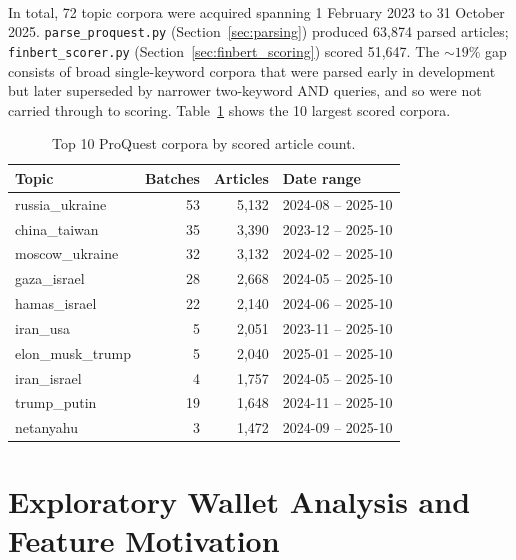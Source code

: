 \documentclass[11pt,a4paper]{article}
\begin{document}
\paragraph{} In total, 72 topic corpora were acquired spanning
1 February 2023 to 31 October 2025. \texttt{parse\_proquest.py}
(Section~\ref{sec:parsing}) produced 63{,}874 parsed articles;
\texttt{finbert\_scorer.py} (Section~\ref{sec:finbert_scoring})
scored 51{,}647. The ${\sim}19\%$ gap consists of broad
single-keyword corpora that were parsed early in development but
later superseded by narrower two-keyword AND queries, and so were
not carried through to scoring. Table~\ref{tab:corpus_sizes} shows
the 10 largest scored corpora.

\begin{table}[H]
\centering
\caption{Top 10 ProQuest corpora by scored article count.}
\label{tab:corpus_sizes}
\small
\begin{tabularx}{\textwidth}{X r r l}
\toprule
\textbf{Topic} & \textbf{Batches} & \textbf{Articles} & \textbf{Date range} \\
\midrule
russia\_ukraine   & 53 & 5{,}132 & 2024-08 -- 2025-10 \\
china\_taiwan     & 35 & 3{,}390 & 2023-12 -- 2025-10 \\
moscow\_ukraine   & 32 & 3{,}132 & 2024-02 -- 2025-10 \\
gaza\_israel      & 28 & 2{,}668 & 2024-05 -- 2025-10 \\
hamas\_israel     & 22 & 2{,}140 & 2024-06 -- 2025-10 \\
iran\_usa         &  5 & 2{,}051 & 2023-11 -- 2025-10 \\
elon\_musk\_trump &  5 & 2{,}040 & 2025-01 -- 2025-10 \\
iran\_israel      &  4 & 1{,}757 & 2024-05 -- 2025-10 \\
trump\_putin      & 19 & 1{,}648 & 2024-11 -- 2025-10 \\
netanyahu         &  3 & 1{,}472 & 2024-09 -- 2025-10 \\
\bottomrule
\end{tabularx}
\end{table}

\section{Exploratory Wallet Analysis and Feature Motivation}
\label{sec:eda}
\end{document}

